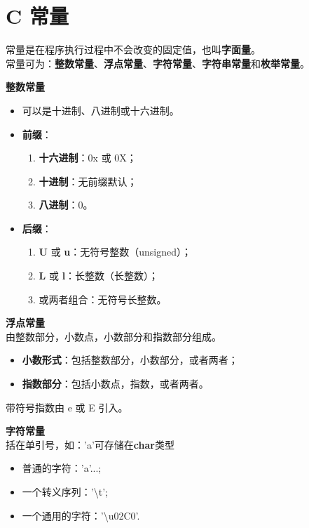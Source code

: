 \documentclass[UTF8]{ctexart}
\begin{document}
	\clearpage
	\section{C 常量}
	常量是在程序执行过程中不会改变的固定值，也叫\textbf{字面量}。\\
	常量可为：\textbf{整数常量}、\textbf{浮点常量}、\textbf{字符常量}、\textbf{字符串常量}和\textbf{枚举常量}。
	
	\textbf{整数常量}\begin{itemize}
		\item 可以是十进制、八进制或十六进制。
		\item \textbf{前缀}：\begin{enumerate}
			\item \textbf{十六进制}：0x 或 0X；
			\item \textbf{十进制}：无前缀默认；
			\item \textbf{八进制}：0。
		\end{enumerate}
		\item \textbf{后缀}：\begin{enumerate}
			\item \textbf{U} 或 \textbf{u}：无符号整数（unsigned）；
			\item \textbf{L} 或 \textbf{l}：长整数（长整数）；
			\item 或两者组合：无符号长整数。
		\end{enumerate}
	\end{itemize}

	\textbf{浮点常量}\\由整数部分，小数点，小数部分和指数部分组成。
	\begin{itemize}
		\item \textbf{小数形式}：包括整数部分，小数部分，或者两者；
		\item \textbf{指数部分}：包括小数点，指数，或者两者。
	\end{itemize}
	带符号指数由 e 或 E 引入。
	
	\textbf{字符常量}\\括在单引号，如：'a'可存储在\textbf{char}类型\begin{itemize}
		\item 普通的字符：'a'...;
		\item 一个转义序列：'\textbackslash t';
		\item 一个通用的字符：'\textbackslash u02C0'.
	\end{itemize}
\end{document}
